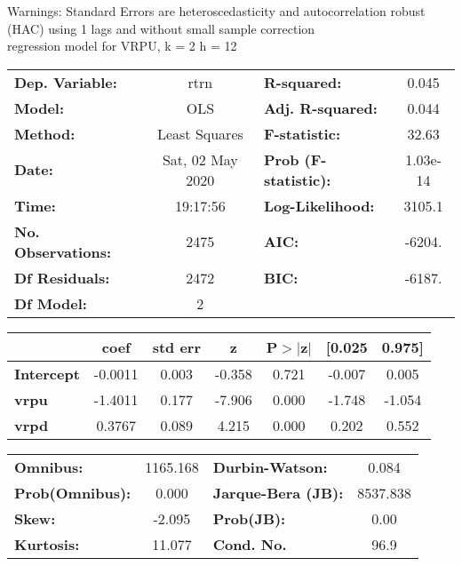 Warnings: \newline
 [1] Standard Errors are heteroscedasticity and autocorrelation robust (HAC) using 1 lags and without small sample correction\\ 

regression model for VRPU, k = 2 h = 12\begin{center}
\begin{tabular}{lclc}
\toprule
\textbf{Dep. Variable:}    &       rtrn       & \textbf{  R-squared:         } &     0.045   \\
\textbf{Model:}            &       OLS        & \textbf{  Adj. R-squared:    } &     0.044   \\
\textbf{Method:}           &  Least Squares   & \textbf{  F-statistic:       } &     32.63   \\
\textbf{Date:}             & Sat, 02 May 2020 & \textbf{  Prob (F-statistic):} &  1.03e-14   \\
\textbf{Time:}             &     19:17:56     & \textbf{  Log-Likelihood:    } &    3105.1   \\
\textbf{No. Observations:} &        2475      & \textbf{  AIC:               } &    -6204.   \\
\textbf{Df Residuals:}     &        2472      & \textbf{  BIC:               } &    -6187.   \\
\textbf{Df Model:}         &           2      & \textbf{                     } &             \\
\bottomrule
\end{tabular}
\begin{tabular}{lcccccc}
                   & \textbf{coef} & \textbf{std err} & \textbf{z} & \textbf{P$> |$z$|$} & \textbf{[0.025} & \textbf{0.975]}  \\
\midrule
\textbf{Intercept} &      -0.0011  &        0.003     &    -0.358  &         0.721        &       -0.007    &        0.005     \\
\textbf{vrpu}      &      -1.4011  &        0.177     &    -7.906  &         0.000        &       -1.748    &       -1.054     \\
\textbf{vrpd}      &       0.3767  &        0.089     &     4.215  &         0.000        &        0.202    &        0.552     \\
\bottomrule
\end{tabular}
\begin{tabular}{lclc}
\textbf{Omnibus:}       & 1165.168 & \textbf{  Durbin-Watson:     } &    0.084  \\
\textbf{Prob(Omnibus):} &   0.000  & \textbf{  Jarque-Bera (JB):  } & 8537.838  \\
\textbf{Skew:}          &  -2.095  & \textbf{  Prob(JB):          } &     0.00  \\
\textbf{Kurtosis:}      &  11.077  & \textbf{  Cond. No.          } &     96.9  \\
\bottomrule
\end{tabular}
\end{center}

